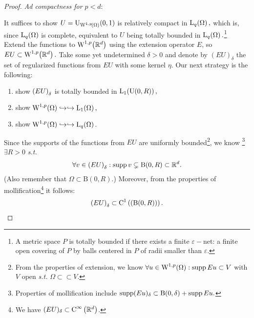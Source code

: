 \documentclass{article}
\begin{document}
\begin{proof}
	\textit{Ad compactness for $p<d$}:

	It suffices to show $U = \text{U}_{\WkpSet[1][p]{\Omega}}(0,1)$ is relatively compact in $\LpSet[q]{\Omega},$ which is, since $\LpSet[q]{\Omega}$ is complete, equivalent to $U$ being totally bounded in $\LpSet[q]{\Omega}.$\footnote{A metric space $P$ is totally bounded if there exists a finite $\varepsilon-$net: a finite open covering of $P$ by balls centered in $P$ of radii smaller than $\varepsilon$.} Extend the functions to $\WkpSet[1][p]{\R^{d}}$ using the extension operator $E$, so $EU \subset \WkpSet[1][p]{\R^{d}}.$ Take some yet undetermined $\delta>0$ and denote by $(EU)_{\delta}$ the set of regularized functions from $EU$ with some kernel $\eta$. Our next strategy is the following:

	\begin{enumerate}
		\item show $\qty(EU)_{\delta}$ is totally bounded in $\LpSet[1]{\text{U}(0,R)},$
		\item show $\WkpSet[1][p]{\Omega} \hookrightarrow \hookrightarrow \LpSet[1]{\Omega},$
		\item show $\WkpSet[1][p]{\Omega} \hookrightarrow \hookrightarrow \LpSet[q]{\Omega}.$
	\end{enumerate}

	Since the supports of the functions from $EU$ are uniformly bounded\footnote{From the properties of extension, we know $ \forall u \in \WkpSet[1][p]{\Omega}:\supp Eu \subset V$ with $V$ open \textit{s.t.} $\Omega \subset \subset V.$}, we know \footnote{Properties of mollification include $\operatorname{supp} (Eu)_{\delta} \subset \text{B}(0,\delta) + \operatorname{supp} Eu.$} $\exists R>0$ \textit{s.t.}
	\[
		\forall v \in \qty(EU)_{\delta}: \operatorname{supp} v \subsetneq \text{B}(0,R) \subset {\mathbb R}^d.
	\]
	(Also remember that $\Omega \subset \text{B}(0,R).$)
	Moreover, from the properties of mollification\footnote{We have $(EU)_{\delta} \subset \text{C}^{\infty}\!\,\left({\mathbb R}^{d} \right)$.} it follows: 
	\[
		\qty(EU)_{\delta} \subset \text{C}^{1}\!\,\left(\qty(\text{B}(0,R)) \right).
	\]


\end{proof}
\end{document}
